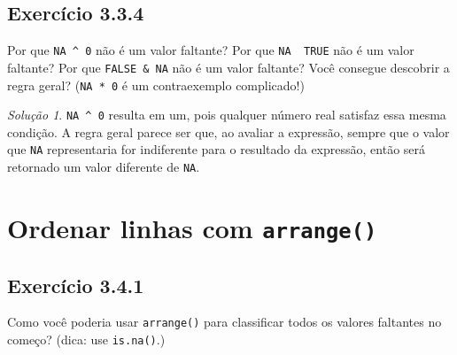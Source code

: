 \documentclass[
]{latex/krantz}
\theoremstyle{definition}
\theoremstyle{definition}
\theoremstyle{definition}
\theoremstyle{definition}
\theoremstyle{remark}
\newtheorem*{solution}{Solução}
\begin{document}
\hypertarget{exr3-3-4}{%
\subsection*{Exercício 3.3.4}\label{exr3-3-4}}

Por que \texttt{NA\ \^{}\ 0} não é um valor faltante? Por que \texttt{NA\ \textbar{}\ TRUE} não é um valor faltante? Por que \texttt{FALSE\ \&\ NA} não é um valor faltante? Você consegue descobrir a regra geral? (\texttt{NA\ *\ 0} é um contraexemplo complicado!)

\begin{solution}
\texttt{NA\ \^{}\ 0} resulta em um, pois qualquer número real satisfaz essa mesma condição. A regra geral parece ser que, ao avaliar a expressão, sempre que o valor que \texttt{NA} representaria for indiferente para o resultado da expressão, então será retornado um valor diferente de \texttt{NA}.
\end{solution}

\hypertarget{ordenar-linhas-com-arrange}{%
\section{\texorpdfstring{Ordenar linhas com \texttt{arrange()}}{Ordenar linhas com arrange()}}\label{ordenar-linhas-com-arrange}}

\hypertarget{exr3-4-1}{%
\subsection*{Exercício 3.4.1}\label{exr3-4-1}}

Como você poderia usar \texttt{arrange()} para classificar todos os valores faltantes no começo? (dica: use \texttt{is.na()}.)
\end{document}
